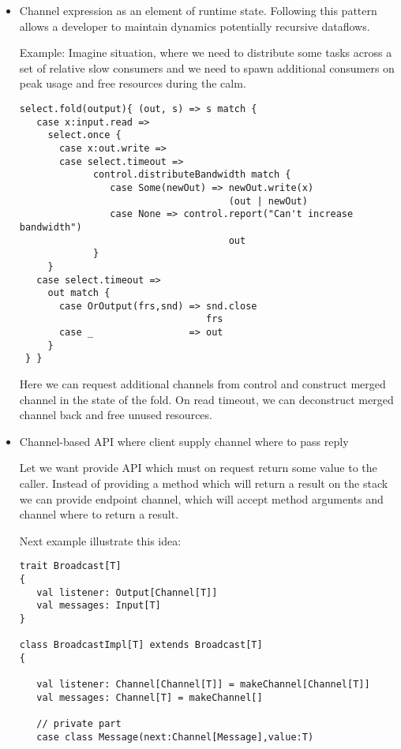 \documentclass[12pt]{article}
\begin{document}
\begin{itemize}
 \item Channel expression as an element of runtime state. Following this pattern allows a developer to maintain dynamics potentially recursive dataflows. 
 
 Example: 
  Imagine situation, where we need to distribute some tasks across a set of relative slow consumers and we need to spawn additional consumers on peak usage and free resources during the calm. 

\begin{Verbatim}[fontsize=\small]
 select.fold(output){ (out, s) => s match {
   case x:input.read =>
     select.once {
       case x:out.write =>
       case select.timeout =>
             control.distributeBandwidth match {
                case Some(newOut) => newOut.write(x)
                                     (out | newOut)
                case None => control.report("Can't increase bandwidth")
                                     out
             }
     }
   case select.timeout =>
     out match {
       case OrOutput(frs,snd) => snd.close
                                 frs
       case _                 => out
     }
 } }
\end{Verbatim}

 Here we can request additional channels from control and construct merged channel in the state of the fold. On read timeout, we can deconstruct merged channel back and free unused resources.

\item{ Channel-based API where client supply channel where to pass reply }

 Let we want provide API which must on request return some value to the caller. Instead of providing a method which will return a result on the stack we can provide endpoint channel, which will accept method arguments and channel where to return a result. 

 Next example illustrate this idea:

\begin{Verbatim}[fontsize=\small]
trait Broadcast[T]
{
   val listener: Output[Channel[T]]
   val messages: Input[T] 
}

class BroadcastImpl[T] extends Broadcast[T]
{

   val listener: Channel[Channel[T]] = makeChannel[Channel[T]]
   val messages: Channel[T] = makeChannel[]

   // private part
   case class Message(next:Channel[Message],value:T)


\end{Verbatim}
\end{itemize}
\end{document}
